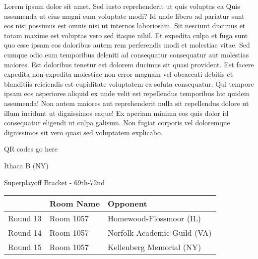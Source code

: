 \documentclass{article}%
\begin{document}
\vspace*{8pt}%
\linebreak%
\newline%
\newline%
Lorem ipsum dolor sit amet. Sed iusto reprehenderit ut quis voluptas ea Quis assumenda ut eius magni eum voluptate modi? Id unde libero ad pariatur sunt eos nisi possimus est omnis nisi ut internos laboriosam. Sit nesciunt ducimus et totam maxime est voluptas vero sed itaque nihil. Et expedita culpa et fuga sunt quo esse ipsam eos doloribus autem rem perferendis modi et molestiae vitae.\newline%
\newline%
Sed cumque odio eum temporibus deleniti ad consequatur consequatur aut molestias maiores. Est doloribus tenetur est dolorem ducimus sit quasi provident. Est facere expedita non expedita molestiae non error magnam vel obcaecati debitis et blanditiis reiciendis est cupiditate voluptatem ea soluta consequatur. Qui tempore ipsam eos asperiores aliquid ex unde velit est repellendus temporibus hic quidem assumenda!\newline%
\newline%
Non autem maiores aut reprehenderit nulla sit repellendus dolore ut illum incidunt ut dignissimos eaque! Ex aperiam minima eos quis dolor id consequatur eligendi ut culpa galisum. Non fugiat corporis vel doloremque dignissimos sit vero quasi sed voluptatem explicabo.\newline%
\newline%
%
\vspace*{30pt}%
\begin{center}%
\begin{Huge}%
QR codes go here%
\end{Huge}%
\end{center}%
\newpage%
\begin{center}%
\begin{Huge}%
Ithaca B (NY)%
\end{Huge}%
\vspace*{8pt}%
\linebreak%
\begin{Large}%
Superplayoff Bracket {-} 69th{-}72nd%
\end{Large}%
\end{center}%
%
\begin{tabularx}{\textwidth}{|c|Y|Y|}%
\hline%
&Room Name&Opponent\\%
\hline%
Round 13&Room 1057&Homewood{-}Flossmoor (IL)\\%
Round 14&Room 1057&Norfolk Academic Guild (VA)\\%
Round 15&Room 1057&Kellenberg Memorial (NY)\\%
\hline%
\end{tabularx}%
\end{document}
